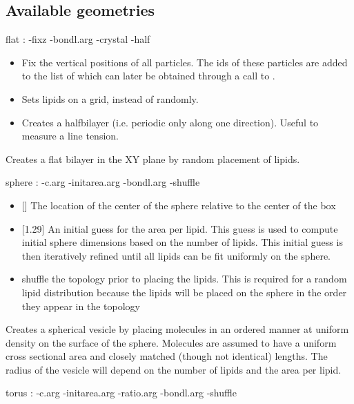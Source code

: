\subsection{Available geometries}

\begin{code}
  flat  :  -fixz -bondl.arg -crystal -half
\end{code}
\begin{itemize}
\item {} Fix the vertical positions of all particles. The ids of these particles are added to the list of  which can later be obtained through a call to .
\item {} Sets lipids on a grid, instead of randomly.
\item {} Creates a halfbilayer (i.e. periodic only along one direction). Useful to measure a line tension.
\end{itemize}
Creates a flat bilayer in the XY plane by random placement of lipids.
\begin{code}
  sphere : -c.arg -initarea.arg -bondl.arg -shuffle
\end{code}
\begin{itemize}
\item {} [] The location of the center of the sphere relative to the center of the box
\item {} [1.29] An initial guess for the area per lipid. This guess is used to compute initial sphere dimensions based on the number of lipids. This initial guess is then iteratively refined until all lipids can be fit uniformly on the sphere.
\item {} shuffle the topology prior to placing the lipids. This is required for a random lipid distribution because the lipids will be placed on the sphere in the order they appear in the topology
\end{itemize}
Creates a spherical vesicle by placing molecules in an ordered manner at uniform density on the surface of the sphere. Molecules are assumed to have a uniform cross sectional area and closely matched (though not identical) lengths. The radius of the vesicle will depend on the number of lipids and the area per lipid.
\begin{code}
  torus : -c.arg -initarea.arg -ratio.arg -bondl.arg -shuffle
\end{code}
